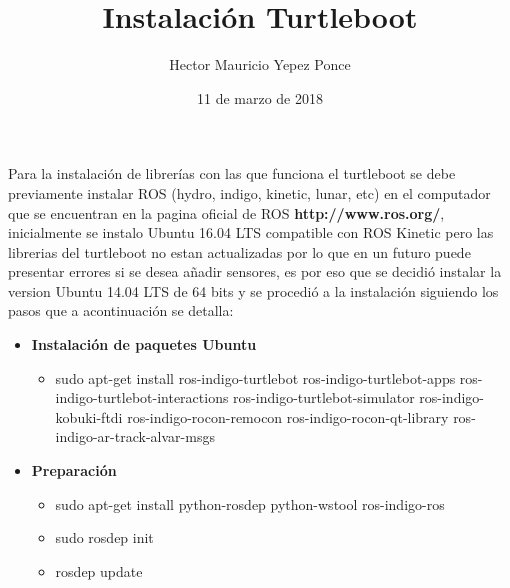 \documentclass[12pt,a4paper]{article}
\author{Hector Mauricio Yepez Ponce}
\date{11 de marzo de 2018}
\title{Instalación Turtleboot}
\begin{document}
\maketitle
Para la instalación de librerías con las que funciona el turtleboot se debe previamente instalar ROS (hydro, indigo, kinetic, lunar, etc) en el computador que se encuentran en la pagina oficial de ROS \textbf{http://www.ros.org/}, inicialmente se instalo Ubuntu 16.04 LTS compatible con ROS Kinetic pero las librerias del turtleboot no estan actualizadas por lo que en un futuro puede presentar errores si se desea añadir sensores, es por eso que se decidió instalar la version Ubuntu 14.04 LTS de 64 bits y se procedió a la instalación siguiendo los pasos que a acontinuación se detalla:

\begin{itemize}
\item {\textbf{Instalación de paquetes Ubuntu }}
\begin{itemize}
\item sudo apt-get install ros-indigo-turtlebot ros-indigo-turtlebot-apps ros-indigo-turtlebot-interactions ros-indigo-turtlebot-simulator ros-indigo-kobuki-ftdi ros-indigo-rocon-remocon ros-indigo-rocon-qt-library ros-indigo-ar-track-alvar-msgs
\end{itemize}

\item {\textbf{Preparación}}
\begin{itemize}
\item sudo apt-get install python-rosdep python-wstool ros-indigo-ros
\item sudo rosdep init
\item rosdep update
\end{itemize}


\end{itemize}
\end{document}
